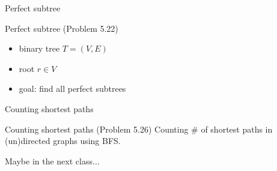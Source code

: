 \begin{frame}{Perfect subtree}
  \begin{exampleblock}{Perfect subtree (Problem 5.22)}
	\begin{itemize}
	  \item binary tree $T = (V, E)$
	  \item root $r \in V$
	  \item goal: find all perfect subtrees
	\end{itemize}
  \end{exampleblock}
\end{frame}
\begin{frame}{Counting shortest paths}
  \begin{exampleblock}{Counting shortest paths (Problem 5.26)}
	Counting \# of shortest paths in (un)directed graphs using BFS.
  \end{exampleblock}

  \pause
  \vspace{0.50cm}
  \centerline{Maybe in the next class$\dots$}
\end{frame}
